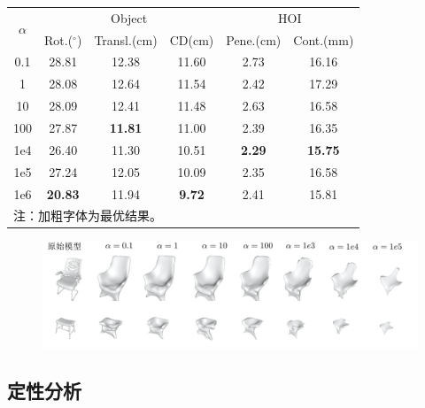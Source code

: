 \begin{table}[!htbp]
	\label{tab:alpha_on_chairs}
	\centering
	\footnotesize
	\setlength{\tabcolsep}{4pt}
	\renewcommand{\arraystretch}{1.2}
	\begin{tabular}{cccccc}
		\toprule
		\multirow{2}{*}{$\alpha$} & \multicolumn{3}{c}{Object} & \multicolumn{2}{c}{HOI} \\
		& Rot.($^\circ$) & Transl.(cm) & CD(cm) & Pene.(cm) & Cont.(mm) \\
		\hline
		0.1 & 28.81 & 12.38 & 11.60 & 2.73 & 16.16 \\
		1 & 28.08 & 12.64 & 11.54 & 2.42 & 17.29 \\
		10 & 28.09 & 12.41 & 11.48 & 2.63 & 16.58 \\
		100 & 27.87 & \textbf{11.81} & 11.00 & 2.39 & 16.35 \\
		1e4 & 26.40 & 11.30 & 10.51 & \textbf{2.29} & \textbf{15.75} \\
		1e5 & 27.24 & 12.05 & 10.09 & 2.35 & 16.58 \\
		1e6 & \textbf{20.83} & 11.94 & \textbf{9.72} & 2.41 & 15.81 \\
		\bottomrule
		\multicolumn{6}{l}{注：加粗字体为最优结果。}
	\end{tabular}
\end{table}

\begin{figure}[!htbp]
	\centering
	\includegraphics[width=0.9\linewidth]{Img/alpha_to_shape_2}
	\label{fig:alpha_shape}
\end{figure}

\subsection{定性分析}

